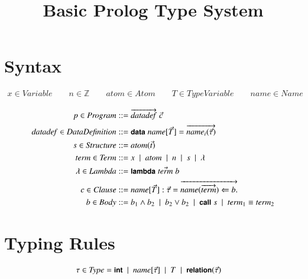 \documentclass[10pt]{article}
\newcommand{\alt}{\ \mid\ }
\newcommand{\mtt}[1]{\ensuremath{\mathit{#1}}}
\newcommand{\anywhere}[1]{\ensuremath{\mbox{#1}}}
\newcommand{\kw}[1]{\anywhere{\sffamily{\bfseries\small {#1}}}}
\newcommand{\term}{\ensuremath{\mtt{term}}\xspace}
\newcommand{\atom}{\ensuremath{\mtt{atom}}\xspace}
\newcommand{\name}{\ensuremath{\mtt{name}}\xspace}
\newcommand{\datadef}{\ensuremath{\mtt{datadef}}\xspace}
\begin{document}
\title{Basic Prolog Type System}
\author{}
\date{}

\maketitle

\section{Syntax}

\begin{gather*}
  x \in \mtt{Variable} \qquad n \in \mathbb{Z} \qquad \atom \in \mtt{Atom} \qquad T \in \mtt{TypeVariable} \qquad \name \in \mtt{Name}
\end{gather*}

\begin{align*}
  p \in \mtt{Program} &::= \overrightarrow{\datadef}\;\vec{c}
  \\
  \datadef \in \mtt{DataDefinition} &::= \kw{data}\; \name[\vec{T}] = \overrightarrow{\name_i(\vec{\tau})}
  \\
  s \in \mtt{Structure} &::= \atom(\vec{t})
  \\
  \term \in \mtt{Term} &::= x \alt \atom \alt n \alt s \alt \lambda
  \\
  \lambda \in \mtt{Lambda} &::= \kw{lambda}\;\vec{\term}\;b
  \\
  c \in \mtt{Clause} &::= \name[\vec{T}] : \vec{\tau} = \overrightarrow{\name(\overrightarrow{\term}) \Leftarrow b.}
  \\
  b \in \mtt{Body} &::= b_1 \land b_2 \alt b_2 \lor b_2
  \alt \kw{call}\;s \alt \term_1 \equiv \term_2
\end{align*}

\section{Typing Rules}
\begin{align*}
  \tau \in \mtt{Type} &= \kw{int} \alt \name[\vec{\tau}] \alt T \alt \kw{relation}(\vec{\tau})
\end{align*}
\end{document}
